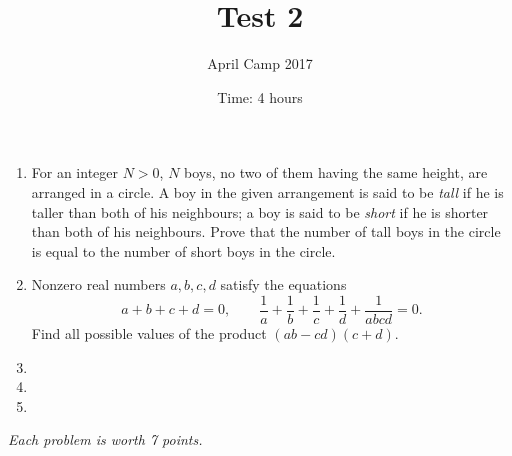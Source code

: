 \documentclass[a4paper,12pt]{article}
\title{Test 2}
\date{Time: 4 hours}
\author{April Camp 2017}
\begin{document}
 \maketitle

\begin{enumerate}
	\item %
	For an integer $N>0$, $N$ boys, no two of them having the same height, are arranged in a circle. A boy in the given arrangement is said to be \emph{tall} if he is taller than both of his neighbours; a boy is said to be \emph{short} if he is shorter than both of his neighbours. Prove that the number of tall boys in the circle is equal to the number of short boys in the circle.
	
	\item %
	Nonzero real numbers $a,b,c,d$ satisfy the equations \[a+b+c+d = 0, \qquad \frac{1}{a}+\frac{1}{b}+\frac{1}{c}+\frac{1}{d}+\frac{1}{abcd} = 0.\]
	Find all possible values of the product $(ab-cd)(c+d)$.

	\item 

	\item 

	\item

\end{enumerate}

\medskip 

\hfill \emph{Each problem is worth 7 points.}
	
\end{document}
